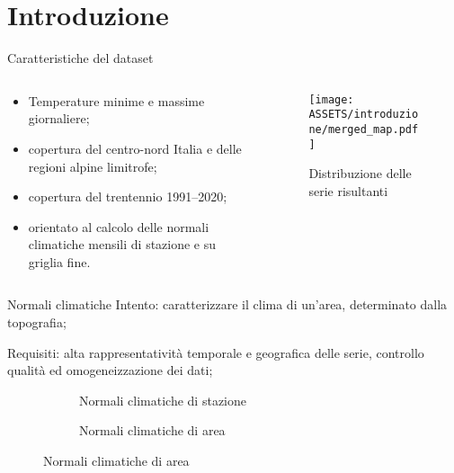 
\section{Introduzione}

\begin{frame}{Caratteristiche del dataset}
  \begin{columns}
    \begin{column}{0.5\textwidth}
      \begin{itemize}
        \item Temperature minime e massime giornaliere;
        \item copertura del centro-nord Italia e delle regioni alpine limitrofe;
        \item copertura del trentennio 1991--2020;
        \item orientato al calcolo delle normali climatiche mensili di stazione e su griglia fine.
      \end{itemize}
    \end{column}
    \begin{column}{0.5\textwidth}
      \begin{figure}
        \texttt{[image: ASSETS/introduzione/merged\_map.pdf]}
        \caption*{Distribuzione delle serie risultanti}
      \end{figure}
    \end{column}
  \end{columns}
\end{frame}

\begin{frame}{Normali climatiche}
  Intento: caratterizzare il clima di un'area, determinato dalla topografia;

  Requisiti: alta rappresentatività temporale e geografica delle serie, controllo qualità ed omogeneizzazione dei dati;
  \begin{figure}
    \centering
    \begin{subtable}[m]{0.3\textwidth}
      \centering
      \footnotesize
      
      \caption{Dato meteorologico giornaliero}
    \end{subtable}
    \hfill
    \begin{subfigure}[m]{0.3\textwidth}
      \centering
      
      \caption{Normali climatiche di stazione}
    \end{subfigure}
    \hfill
    \begin{subfigure}[m]{0.3\textwidth}
      
      \caption{Normali climatiche di area}
    \end{subfigure}
  \end{figure}
\end{frame}

